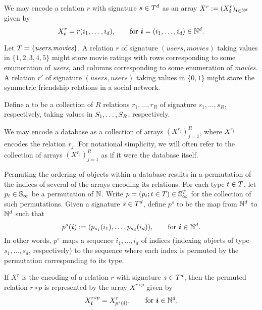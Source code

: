 We may encode a relation $r$ with signature $s \in T^d$ as an array $X^r := (X^r_{\bm{i}})_{\bm{i} \in \mathbb{N}^d}$ given by
\[
X^r_{\bm{i}} = r(i_1,\dotsc,i_d), \qquad \text{for } \bm{i} = (i_1,\dotsc, i_d) \in \mathbb{N}^d.
\]

\begin{example} 
Let $T = \{\textit{users,movies}\}$.
A relation $r$ of signature $(\textit{users},\textit{movies})$ taking values in $\{1,2,3,4,5\}$ might store movie ratings with rows corresponding to some enumeration of \textit{users}, and columns corresponding to some enumeration of \textit{movies}. 
A relation $r'$ of signature $(\textit{users},\textit{users})$ taking values in $\{0,1\}$ might store the symmetric friendship relations in a social network.
\end{example}

\begin{definition}[database]
Define a  to be a collection of $R$ relations $r_1,\dotsc,r_R$ of signature $s_1,\dotsc,s_R$, respectively, taking values in $S_1,\dotsc,S_R$, respectively.
\end{definition}

We may encode a database as a collection of arrays $(X^{r_j})_{j=1}^R$, where $X^{r_j}$ encodes the relation $r_j$.  
For notational simplicity, we will often refer to the collection of arrays $(X^{r_j})_{j=1}^R$ as if it were the database itself.

Permuting the ordering of objects within a database results in a permutation of the indices of several of the arrays encoding its relations.
For each type $t \in T$, let $p_t \in \mathbb{S}_{\infty}$ be a permutation of $\mathbb{N}$. 
Write $p = (p_t ; t \in T) \in \mathbb{S}_{\infty}^T$ for the collection of such permutations.
Given a signature $s \in T^d$, define $p^s$ to be the map from $\mathbb{N}^d$ to $\mathbb{N}^d$ such that
\[
p^s(\bm{i}) := (p_{s_1}(i_1), \dotsc,p_{s_d}(i_d)), \qquad \text{for } \bm{i} \in \mathbb{N}^d.
\]
In other words, $p^s$ maps a sequence $i_1,\dotsc,i_d$ of indices (indexing objects of type $s_1,\dotsc,s_d$, respectively) to the sequence where each index is permuted by the permutation corresponding to its type.

If $X^r$ is the encoding of a relation $r$ with signature $s \in T^d$, then the permuted relation $r \circ p$ is represented by the array $X^{r\circ p}$ given by
\[
X^{r \circ p}_{\bm{i}} = X^r_{p^s(\bm{i})}, \qquad \text{for } \bm{i} \in \mathbb{N}^d.
\]


